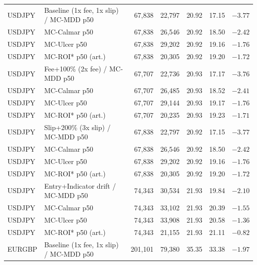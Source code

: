 \begin{table}[ht]
\begin{tabular}{llrrrrr}
\midrule
USDJPY & Baseline (1x fee, 1x slip) / MC-MDD p50 & 67,838 & 22,797 & 20.92 & 17.15 & $-3.77$ \\
USDJPY & \hspace{1em}MC-Calmar p50 & 67,838 & 26,546 & 20.92 & 18.50 & $-2.42$ \\
USDJPY & \hspace{1em}MC-Ulcer p50 & 67,838 & 29,202 & 20.92 & 19.16 & $-1.76$ \\
USDJPY & \hspace{1em}MC-ROI* p50 (art.) & 67,838 & 20,305 & 20.92 & 19.20 & $-1.72$ \\
USDJPY & Fee+100\% (2x fee) / MC-MDD p50 & 67,707 & 22,736 & 20.93 & 17.17 & $-3.76$ \\
USDJPY & \hspace{1em}MC-Calmar p50 & 67,707 & 26,485 & 20.93 & 18.52 & $-2.41$ \\
USDJPY & \hspace{1em}MC-Ulcer p50 & 67,707 & 29,144 & 20.93 & 19.17 & $-1.76$ \\
USDJPY & \hspace{1em}MC-ROI* p50 (art.) & 67,707 & 20,235 & 20.93 & 19.23 & $-1.71$ \\
USDJPY & Slip+200\% (3x slip) / MC-MDD p50 & 67,838 & 22,797 & 20.92 & 17.15 & $-3.77$ \\
USDJPY & \hspace{1em}MC-Calmar p50 & 67,838 & 26,546 & 20.92 & 18.50 & $-2.42$ \\
USDJPY & \hspace{1em}MC-Ulcer p50 & 67,838 & 29,202 & 20.92 & 19.16 & $-1.76$ \\
USDJPY & \hspace{1em}MC-ROI* p50 (art.) & 67,838 & 20,305 & 20.92 & 19.20 & $-1.72$ \\
USDJPY & Entry+Indicator drift / MC-MDD p50 & 74,343 & 30,534 & 21.93 & 19.84 & $-2.10$ \\
USDJPY & \hspace{1em}MC-Calmar p50 & 74,343 & 33,102 & 21.93 & 20.39 & $-1.55$ \\
USDJPY & \hspace{1em}MC-Ulcer p50 & 74,343 & 33,908 & 21.93 & 20.58 & $-1.36$ \\
USDJPY & \hspace{1em}MC-ROI* p50 (art.) & 74,343 & 21,155 & 21.93 & 21.11 & $-0.82$ \\
\midrule
EURGBP & Baseline (1x fee, 1x slip) / MC-MDD p50 & 201,101 & 79,380 & 35.35 & 33.38 & $-1.97$ \\

\end{tabular}
\end{table}

